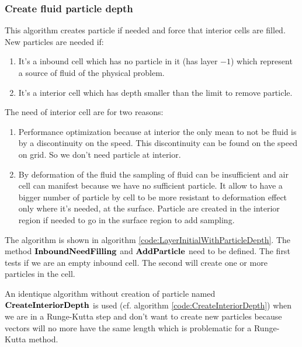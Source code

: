 \subsubsection{Create fluid particle depth}

This algorithm creates particle if needed and force that interior cells are filled.
New particles are needed if:
\begin{enumerate}
\item It's a inbound cell which has no particle in it (has layer $-1$) which represent a source of fluid of the physical problem.
\item It's a interior cell which has depth smaller than the limit to remove particle.
\end{enumerate}

The need of interior cell are for two reasons:
\begin{enumerate}
 \item Performance optimization because at interior the only mean to not be fluid is by a discontinuity on the speed.
 This discontinuity can be found on the speed on grid. So we don't need particle at interior.
 \item By deformation of the fluid the sampling of fluid can be insufficient and air cell can manifest because we have no sufficient particle.
 It allow to have a bigger number of particle by cell to be more resistant to deformation effect only where it's needed,
 at the surface. Particle are created in the interior region if needed to go in the surface region to add sampling.
\end{enumerate}

The algorithm is shown in algorithm \ref{code:LayerInitialWithParticleDepth}.
The method $\mathop{\textbf{InboundNeedFilling}}$ and $\mathop{\textbf{AddParticle}}$ need to be defined.
The first tests if we are an empty inbound cell. The second will create one or more particles in the cell.

An identique algorithm without creation of particle named $\mathop{\textbf{CreateInteriorDepth}}$
is used (cf. algorithm \ref{code:CreateInteriorDepth}) when we are in a Runge-Kutta step and don't want
to create new particles because vectors will no more have the same length which is problematic for a Runge-Kutta method.

